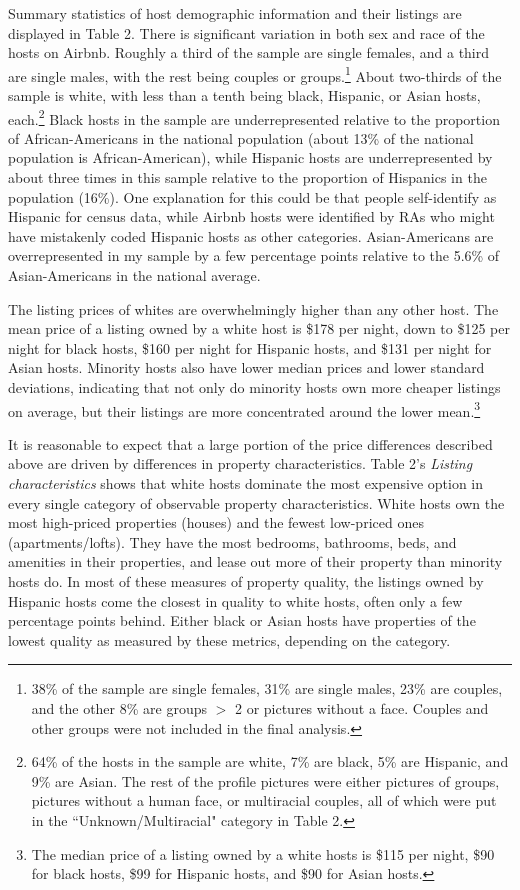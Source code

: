 \documentclass[11pt, oneside]{article}
\begin{document}
Summary statistics of host demographic information and their listings are displayed in Table 2. There is significant variation in both sex and race of the hosts on Airbnb. Roughly a third of the sample are single females, and a third are single males, with the rest being couples or groups.\footnote{38\% of the sample are single females, 31\% are single males, 23\% are couples, and the other 8\% are groups $>$ 2 or pictures without a face. Couples and other groups were not included in the final analysis.} About two-thirds of the sample is white, with less than a tenth being black, Hispanic, or Asian hosts, each.\footnote{64\% of the hosts in the sample are white, 7\% are black, 5\% are Hispanic, and 9\% are Asian. The rest of the profile pictures were either pictures of groups, pictures without a human face, or multiracial couples, all of which were put in the ``Unknown/Multiracial" category in Table 2.} Black hosts in the sample are underrepresented relative to the proportion of African-Americans in the national population (about 13\% of the national population is African-American), while Hispanic hosts are underrepresented by about three times in this sample relative to the proportion of Hispanics in the population (16\%). One explanation for this could be that people self-identify as Hispanic for census data, while Airbnb hosts were identified by RAs who might have mistakenly coded Hispanic hosts as other categories. Asian-Americans are overrepresented in my sample by a few percentage points relative to the 5.6\% of Asian-Americans in the national average.\cite{census} 

The listing prices of whites are overwhelmingly higher than any other host. The mean price of a listing owned by a white host is \$178 per night, down to \$125 per night for black hosts, \$160 per night for Hispanic hosts, and \$131 per night for Asian hosts. Minority hosts also have lower median prices and lower standard deviations, indicating that not only do minority hosts own more cheaper listings on average, but their listings are more concentrated around the lower mean.\footnote{The median price of a listing owned by a white hosts is \$115 per night, \$90 for black hosts, \$99 for Hispanic hosts, and \$90 for Asian hosts.} 

It is reasonable to expect that a large portion of the price differences described above are driven by differences in property characteristics. Table 2's \textit{Listing characteristics} shows that white hosts dominate the most expensive option in every single category of observable property characteristics. White hosts own the most high-priced properties (houses) and the fewest low-priced ones (apartments/lofts). They have the most bedrooms, bathrooms, beds, and amenities in their properties, and lease out more of their property than minority hosts do. In most of these measures of property quality, the listings owned by Hispanic hosts come the closest in quality to white hosts, often only a few percentage points behind. Either black or Asian hosts have properties of the lowest quality as measured by these metrics, depending on the category. 
\end{document}
